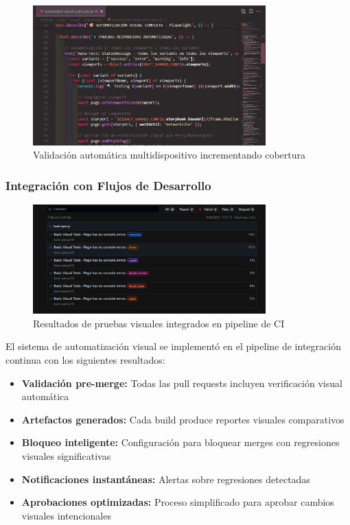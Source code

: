 \documentclass{article}
\begin{document}
\begin{figure}[H]
\centering
\includegraphics[width=0.8\textwidth]{playwright/3Automatizacion_Responsive.png}
\caption{Validación automática multidispositivo incrementando cobertura}
\label{fig:coverage-increase}
\end{figure}

\subsubsection{Integración con Flujos de Desarrollo}

\begin{figure}[H]
\centering
\includegraphics[width=0.8\textwidth]{playwright/passed_results.png}
\caption{Resultados de pruebas visuales integrados en pipeline de CI}
\label{fig:ci-integration}
\end{figure}

El sistema de automatización visual se implementó en el pipeline de integración continua con los siguientes resultados:

\begin{itemize}[nosep]
\item \textbf{Validación pre-merge:} Todas las pull requests incluyen verificación visual automática
\item \textbf{Artefactos generados:} Cada build produce reportes visuales comparativos
\item \textbf{Bloqueo inteligente:} Configuración para bloquear merges con regresiones visuales significativas
\item \textbf{Notificaciones instantáneas:} Alertas sobre regresiones detectadas
\item \textbf{Aprobaciones optimizadas:} Proceso simplificado para aprobar cambios visuales intencionales
\end{itemize}
\end{document}
